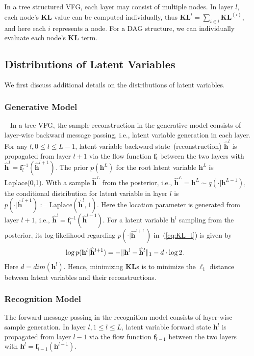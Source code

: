 \documentclass[sigconf, anonymous, review]{acmart}
\theoremstyle{plain}
\theoremstyle{definition}
\theoremstyle{remark}
\begin{document}
In a tree structured VFG, each layer may consist of multiple nodes. In layer $l$, each node's  $\mathbf{KL}$ value can be  computed individually, thus $\mathbf{KL}^l = \sum_{i\in l} \mathbf{KL}^{(i)}$, and here each $i$ represents a node. For a DAG structure, we can individually evaluate each node's $\mathbf{KL}$ term. 


\subsection{Distributions of Latent Variables}
We first discuss additional details on the distributions of latent variables.

\subsubsection{Generative Model}~\label{sec:generative}
In a tree VFG, the sample reconstruction in the generative model consists of layer-wise backward message passing, i.e., latent variable generation in each layer.  For any $l, 0 \leq l \leq L-1$, latent variable backward state~(reconstruction) $\widehat{\mathbf{h}}^{l}$ is propagated   from layer $l+1$ via the flow function $\mathbf{f}_l$ between the two layers with $\widehat{\mathbf{h}}^{l}= \mathbf{f}_l^{-1}(\widehat{\mathbf{h}}^{l+1})$. 
The prior $p(\mathbf{h}^L)$ for the root latent variable $\mathbf{h}^L$ is  Laplace(0,1). With a sample $\widehat{\mathbf{h}}^L$ from the posterior, i.e., $\widehat{\mathbf{h}}^L=\mathbf{h}^L \sim q(\cdot | \mathbf{h}^{L-1}) $,  the conditional distribution for latent variable in layer $l$ is   $p(\cdot | \widehat{\mathbf{h}}^{l+1}):=\text{Laplace}(\widehat{\mathbf{h}}^l, 1)$. Here the location parameter is generated from layer $l+1$, i.e., $\widehat{\mathbf{h}}^{l}= \mathbf{f}_l^{-1}(\widehat{\mathbf{h}}^{l+1})$. 
For a latent variable  $\mathbf{h}^l$ sampling from the posterior, its log-likelihood regarding $p(\cdot | \widehat{\mathbf{h}}^{l+1})$ in~(\ref{eq:KL_l}) is given by 
\begin{align} \notag
& \log p(\mathbf{h}^l | \widehat{\mathbf{h}}^{l+1}) = -\|\mathbf{h}^l- \widehat{\mathbf{h}}^l\|_1 -d\cdot\log2  .
\end{align}
Here $d = dim(\mathbf{h}^l)$. Hence, minimizing  $\mathbf{KL}$s is to minimize the $\ell_1$ distance between latent variables and their reconstructions. 


\subsubsection{Recognition Model}
The forward message passing in the recognition model consists of  layer-wise sample generation. In layer $l, 1 \leq l \leq L$, latent variable forward state $\mathbf{h}^{l}$ is propagated   from layer $l-1$ via the flow function $\mathbf{f}_{l-1}$ between the two layers with $\mathbf{h}^{l}= \mathbf{f}_{l-1}(\mathbf{h}^{l-1})$. 
\end{document}
